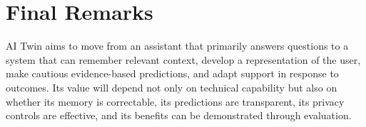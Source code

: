 \documentclass{tietreport}
\begin{document}
\section{Final Remarks}
AI Twin aims to move from an assistant that primarily answers questions to a system that can remember relevant context, develop a representation of the user, make cautious evidence-based predictions, and adapt support in response to outcomes. Its value will depend not only on technical capability but also on whether its memory is correctable, its predictions are transparent, its privacy controls are effective, and its benefits can be demonstrated through evaluation.

\begingroup
\setlength{\emergencystretch}{3em}
\printbibliography[heading=bibintoc]
\endgroup
\end{document}
